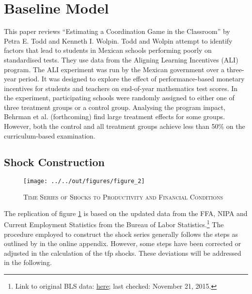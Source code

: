 \section{Baseline Model}
\label{sec:baseline_model}


This paper reviews “Estimating a Coordination Game in the Classroom” by Petra E. Todd and Kenneth I. Wolpin. Todd and Wolpin attempt to identify factors that lead to students in Mexican schools performing poorly on standardised tests. They use data from the Aligning Learning Incentives (ALI) program. The ALI experiment was run by the Mexican government over a three- year period. It was designed to explore the effect of performance-based monetary incentives for students and teachers on end-of-year mathematics test scores. In the experiment, participating schools were randomly assigned to either one of three treatment groups or a control group.
Analysing the program impact, Behrman et al. (forthcoming) find large treatment effects for some groups. However, both the control and all treatment groups achieve less than 50\% on the curriculum-based examination. 


\subsection{Shock Construction}
\label{sec:shock_construction}

\begin{figure}[ht]
    
    \centering

    \texttt{[image: ../../out/figures/figure\_2]}

    \caption{\textsc{Time Series of Shocks to Productivity and Financial Conditions}}
    
    \label{fig:figure_2}

\end{figure}

The replication of figure \ref{fig:figure_2} is based on the updated data from the FFA, NIPA and Current Employment Statistics from the Bureau of Labor Statistics.\footnote{Link to original BLS data: \href{https://research.stlouisfed.org/fred2/series/AWHI/downloaddata}{here}; last checked: November 21, 2015.} 
The procedure employed to construct the shock series generally follows the steps as outlined by \citeauthor{JERMANNfinancial} in the online appendix. However, some steps have been corrected or adjusted in the calculation of the tfp shocks. These deviations will be addressed in the following. 

